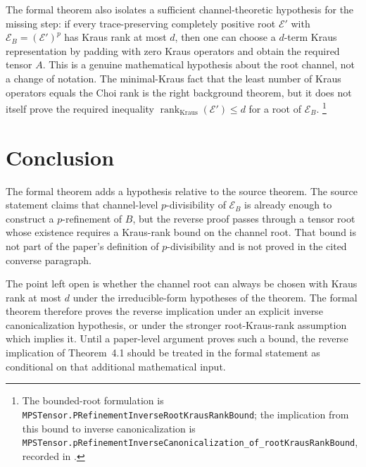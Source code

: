 \documentclass{article}
\begin{document}
The formal theorem also isolates a sufficient channel-theoretic hypothesis for
the missing step: if every trace-preserving completely positive root
$\mathcal E'$ with $\mathcal E_B=(\mathcal E')^p$ has Kraus rank at most $d$,
then one can choose a $d$-term Kraus representation by padding with zero Kraus
operators and obtain the required tensor $A$. This is a genuine mathematical
hypothesis about the root channel, not a change of notation. The minimal-Kraus
fact that the least number of Kraus operators equals the Choi rank is the right
background theorem, but it does not itself prove the required inequality
$\operatorname{rank}_{\mathrm{Kraus}}(\mathcal E')\le d$ for a root of
$\mathcal E_B$.
\footnote{The bounded-root formulation is
\texttt{MPSTensor.PRefinementInverseRootKrausRankBound}; the implication from
this bound to inverse canonicalization is
\texttt{MPSTensor.pRefinementInverseCanonicalization\_of\_rootKrausRankBound},
recorded in .}

\section{Conclusion}

The formal theorem adds a hypothesis relative to the source theorem. The source
statement claims that channel-level $p$-divisibility of $\mathcal E_B$ is already
enough to construct a $p$-refinement of $B$, but the reverse proof passes through
a tensor root whose existence requires a Kraus-rank bound on the channel root.
That bound is not part of the paper's definition of $p$-divisibility and is not
proved in the cited converse paragraph.

The point left open is whether the channel root can always be chosen with Kraus
rank at most $d$ under the irreducible-form hypotheses of the theorem. The formal
theorem therefore proves the reverse implication under an explicit inverse
canonicalization hypothesis, or under the stronger root-Kraus-rank assumption
which implies it. Until a paper-level argument proves such a bound, the reverse
implication of Theorem~4.1 should be treated in the formal statement as
conditional on that additional mathematical input.



\end{document}
